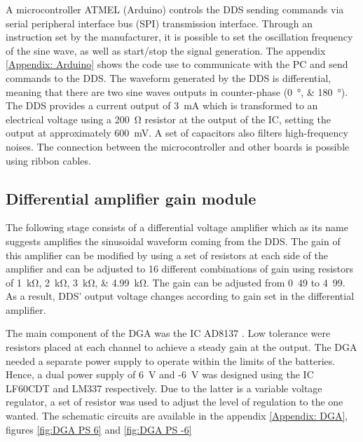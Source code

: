 
A microcontroller ATMEL (Arduino) controls the DDS sending commands via serial peripheral interface bus (SPI) transmission interface. Through an instruction set by the manufacturer, it is possible to set the oscillation frequency of the sine wave, as well as start/stop the signal generation. The appendix \ref{Appendix: Arduino} shows the code use to communicate with the PC and send commands to the DDS. The waveform generated by the DDS is differential, meaning that there are two sine waves outputs in counter-phase (\SIlist{0;180}{\degree}). The DDS provides a current output of \SI{3}{\mA} which is transformed to an electrical voltage using a \SI{200}{\ohm} resistor at the output of the IC, setting the output at approximately \SI{600}{\mV}. A set of capacitors also filters high-frequency noises. The connection between the microcontroller and other boards is possible using ribbon cables. 


\subsection{Differential amplifier gain module}
The following stage consists of a differential voltage amplifier which as its name suggests amplifies the sinusoidal waveform coming from the DDS. The gain of this amplifier can be modified by using a set of resistors at each side of the amplifier and can be adjusted to 16 different combinations of gain using resistors of \SIlist{1;2;3;4.99}{\kohm}. The gain can be adjusted from \si{0.49} to \si{4.99}. As a result, DDS’ output voltage changes according to gain set in the differential amplifier. 

The main component of the DGA was the IC AD8137 \cite{ad:AD8137}. Low tolerance were resistors placed at each channel to achieve a steady gain at the output. The DGA needed a separate power supply to operate within the limits of the batteries. Hence, a dual power supply of \SI{6}{\volt} and -\SI{6}{\volt} was designed using the IC LF60CDT and LM337 respectively. Due to the latter is a variable voltage regulator, a set of resistor was used to adjust the level of regulation to the one wanted. The schematic circuits are available in the appendix \ref{Appendix: DGA}, figures \ref{fig:DGA PS 6} and \ref{fig:DGA PS -6}

